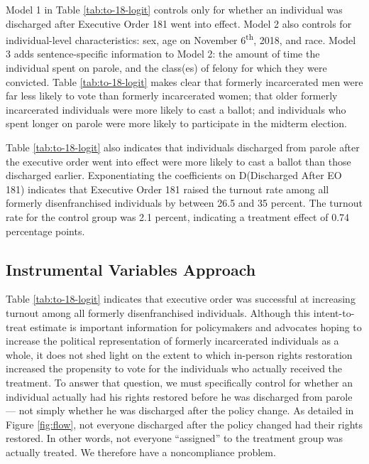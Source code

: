 \documentclass[
  12pt,
]{article}
\begin{document}
Model 1 in Table \ref{tab:to-18-logit} controls only for whether an individual was discharged after Executive Order 181 went into effect. Model 2 also controls for individual-level characteristics: sex, age on November 6\textsuperscript{th}, 2018, and race. Model 3 adds sentence-specific information to Model 2: the amount of time the individual spent on parole, and the class(es) of felony for which they were convicted. Table \ref{tab:to-18-logit} makes clear that formerly incarcerated men were far less likely to vote than formerly incarcerated women; that older formerly incarcerated individuals were more likely to cast a ballot; and individuals who spent longer on parole were more likely to participate in the midterm election.

Table \ref{tab:to-18-logit} also indicates that individuals discharged from parole after the executive order went into effect were more likely to cast a ballot than those discharged earlier. Exponentiating the coefficients on D(Discharged After EO 181) indicates that Executive Order 181 raised the turnout rate among all formerly disenfranchised individuals by between 26.5 and 35 percent. The turnout rate for the control group was 2.1 percent, indicating a treatment effect of 0.74 percentage points.

\hypertarget{instrumental-variables-approach}{%
\subsection*{Instrumental Variables Approach}\label{instrumental-variables-approach}}

Table \ref{tab:to-18-logit} indicates that executive order was successful at increasing turnout among all formerly disenfranchised individuals. Although this intent-to-treat estimate is important information for policymakers and advocates hoping to increase the political representation of formerly incarcerated individuals as a whole, it does not shed light on the extent to which in-person rights restoration increased the propensity to vote for the individuals who actually received the treatment. To answer that question, we must specifically control for whether an individual actually had his rights restored before he was discharged from parole --- not simply whether he was discharged after the policy change. As detailed in Figure \ref{fig:flow}, not everyone discharged after the policy changed had their rights restored. In other words, not everyone ``assigned'' to the treatment group was actually treated. We therefore have a noncompliance problem.
\end{document}
